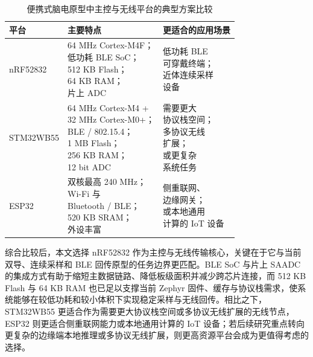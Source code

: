 \begin{table}[htbp]
    \centering
    \caption{便携式脑电原型中主控与无线平台的典型方案比较}
    \label{tab:c3_mcu_compare}
    \begingroup
    \renewcommand{\arraystretch}{1.18}
    \setlength{\tabcolsep}{3pt}
    \begin{tabularx}{0.95\linewidth}{@{}>{\centering\arraybackslash}p{2.15cm}>{\centering\arraybackslash}X>{\centering\arraybackslash}X@{}}
        \toprule[1.5pt]
        平台 & 主要特点 & 更适合的应用场景 \\
        \midrule[1pt]
        nRF52832 & \makecell[c]{64 MHz Cortex-M4F；\\低功耗 BLE SoC；\\512 KB Flash；\\64 KB RAM；\\片上 ADC} & \makecell[c]{低功耗 BLE\\可穿戴终端；\\近体连续采样\\设备} \\
        STM32WB55 & \makecell[c]{64 MHz Cortex-M4 +\\32 MHz Cortex-M0+；\\BLE / 802.15.4；\\1 MB Flash；\\256 KB RAM；\\12 bit ADC} & \makecell[c]{需要更大\\协议栈空间；\\多协议无线\\扩展；\\或更复杂\\系统任务} \\
        ESP32 & \makecell[c]{双核最高 240 MHz；\\Wi-Fi 与\\Bluetooth / BLE；\\520 KB SRAM；\\外设丰富} & \makecell[c]{侧重联网、\\边缘网关；\\或本地通用\\计算的 IoT 设备} \\
        \bottomrule[1.5pt]
    \end{tabularx}
    \endgroup
\end{table}

综合比较后，本文选择 nRF52832 作为主控与无线传输核心，关键在于它与当前双导、连续采样和 BLE 回传原型的任务边界更匹配。BLE SoC 与片上 SAADC 的集成方式有助于缩短主数据链路、降低板级面积并减少跨芯片连接，而 512 KB Flash 与 64 KB RAM 也已足以支撑当前 Zephyr 固件、缓存与协议栈需求，使系统能够在较低功耗和较小体积下实现稳定采样与无线回传。相比之下，STM32WB55 更适合作为需要更大协议栈空间或多协议无线扩展的无线节点，ESP32 则更适合侧重联网能力或本地通用计算的 IoT 设备；若后续研究重点转向更复杂的边缘端本地推理或多协议无线扩展，则更高资源平台会成为更值得考虑的选择。

